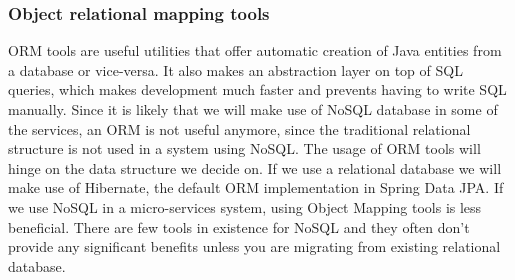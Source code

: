\documentclass[12pt]{article}
\begin{document}
\begin{multicols}{2}
\subsubsection{Object relational mapping tools}
ORM tools are useful utilities that offer automatic creation of Java entities from a database or vice-versa. It also makes an abstraction layer on top of SQL queries, which makes development much faster and prevents having to write SQL manually. Since it is likely that we will make use of NoSQL database in some of the services, an ORM is not useful anymore, since the traditional relational structure is not used in a system using NoSQL. The usage of ORM tools will hinge on the data structure we decide on. If we use a relational database we will make use of Hibernate, the default ORM implementation in Spring Data JPA. If we use NoSQL in a micro-services system, using Object Mapping tools is less beneficial. There are few tools in existence for NoSQL and they often don't provide any significant benefits unless you are migrating from existing relational database. \cite{ormNosql85:online}


\end{multicols}
\end{document}
